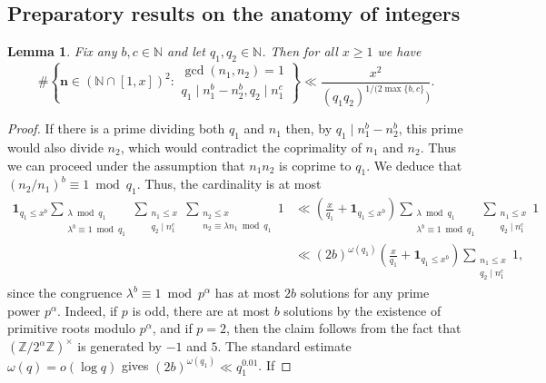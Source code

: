 \documentclass[11pt,letterpaper]{amsart}
\renewcommand{\leq}{\leqslant}
\renewcommand{\geq}{\geqslant}
\newtheorem{lemma}[theorem]{Lemma}
\theoremstyle{definition}
\numberwithin{equation}{section}
\newcommand\N{\mathbb{N}}
\newcommand{\0}{\mathbf{0}}
\begin{document}
\subsection{Preparatory results on the anatomy of integers}\label{sub:preparatory}

\begin{lemma}\label{le_polydiv001} 
 Fix any  $ b,c\in \N$ and let $q_1,q_2\in \N$. Then for all $x\geq 1 $ we have 
$$ 
\# \left\{ \mathbf n \in (\N\cap[1,x])^2:
\begin{array}{l}
\gcd(n_1,n_2)=1 \\ 
q_1 \mid   n_1^b-  n_2^b, q_2 \mid n_1^c
\end{array}
\right\} \ll
\frac{x^2}{(q_1q_2)^{1/(2\max\{b,c\}})}. $$ 
 \end{lemma}

\begin{proof} 
If there is a prime dividing both $q_1$ and $n_1$ then, by $q_1 \mid   n_1^b-  n_2^b$, this prime would also divide $n_2$, which would contradict the coprimality of $n_1$ and $n_2$.
Thus we can proceed under the assumption that $n_1n_2$ is coprime to $q_1$.
We deduce that  $(n_2/n_1)^b\equiv 1\bmod{q_1}$. 
Thus, the cardinality is at most   
\begin{align}\label{eq:nsum}
\mathbf 1_{q_1\leq x^b} 
\sum_{\substack{\lambda \bmod{q_1} \\\lambda ^b\equiv 1\bmod{q_1 }}}
\sum_{\substack{n_1  \leq x \\  q_2 \mid n_1^c }}
\sum_{\substack{n_2 \leq x \\ n_2 \equiv \lambda n_1\bmod{q_1}}}1
 & \ll  \left( \frac{x}{q_1}+ \mathbf 1_{q_1\leq x^b}\right)
\sum_{\substack{\lambda \bmod{q_1} \\\lambda ^b\equiv 1\bmod{q_1 }}}
\sum_{\substack{ n_1  \leq x \\  q_2 \mid n_1^c }}1\nonumber
\\ & \ll  (2b)^{\omega(q_1) }
\left( \frac{x}{q_1}+ \mathbf 1_{q_1\leq x^b}\right)
 \sum_{\substack{n_1  \leq x \\  q_2 \mid n_1^c }}1
,\end{align} 
since the  congruence $\lambda^b\equiv 1\bmod{p^{\alpha}}$ has at most $2b$ solutions for any prime power $p^{\alpha}$.
Indeed,  if $p$ is odd, there are at  most $b$ solutions by the existence of primitive roots modulo $p^{\alpha}$, 
and if $p=2$, then the claim follows from the fact that $(\mathbb{Z}/2^{\alpha}
\mathbb{Z})^{\times}$ is generated by $-1$ and $5$. 
The standard  estimate  $\omega(q)=o( \log q ) $ gives $(2b)^{\omega(q_1)} \ll q_1^{0.01}$. If 

\end{proof}
\end{document}
